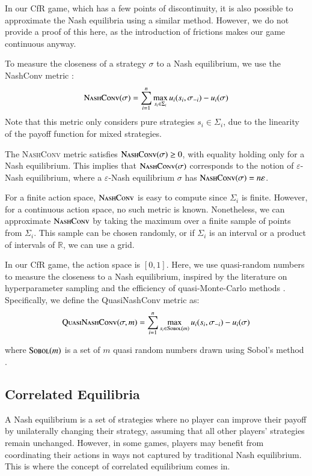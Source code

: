 \documentclass[preprint,12pt,authoryear]{elsarticle}
\theoremstyle{definition}
\begin{document}
In our CfR game, which has a few points of discontinuity, it is also possible to approximate the Nash equilibria using a similar method. However, we do not provide a proof of this here, as the introduction of frictions makes our game continuous anyway. 

To measure the closeness of a strategy $\sigma$ to a Nash equilibrium, we use the NashConv metric \citep{Lanctot2017-wc}: 
$$\textsc{NashConv}(\sigma) = \sum_{i=1}^n \max_{s_i \in \Sigma_i} u_i(s_i, \sigma_{-i}) - u_i(\sigma)$$
Note that this metric only considers pure strategies $s_i \in \Sigma_i$, due to the linearity of the payoff function for mixed strategies. 

The \textsc{NashConv} metric satisfies $\textsc{NashConv}(\sigma) \ge 0$, with equality holding only for a Nash equilibrium. This implies that $\textsc{NashConv}(\sigma)$ corresponds to the notion of $\varepsilon$-Nash equilibrium, where a $\varepsilon$-Nash equilibrium $\sigma$ has $\textsc{NashConv}(\sigma) = n \varepsilon$. 

For a finite action space, $\textsc{NashConv}$ is easy to compute since $\Sigma_i$ is finite. However, for a continuous action space, no such metric is known. Nonetheless, we can approximate $\textsc{NashConv}$ by taking the maximum over a finite sample of points from $\Sigma_i$. This sample can be chosen randomly, or if $\Sigma_i$ is an interval or a product of intervals of $\mathbb{R}$, we can use a grid. 

In our CfR game, the action space is $[0,1]$. Here, we use quasi-random numbers to measure the closeness to a Nash equilibrium, inspired by the literature on hyperparameter sampling \citep{Bousquet2017-kg} and the efficiency of quasi-Monte-Carlo methods \citep{sobol1990quasi}. Specifically, we define the QuasiNashConv metric as: 
$$\textsc{QuasiNashConv}(\sigma, m) = \sum_{i=1}^n \max_{s_i \in \textsc{Sobol}(m)} u_i(s_i, \sigma_{-i}) - u_i(\sigma)$$

where $\textsc{Sobol}(m)$ is a set of $m$ quasi random numbers drawn using Sobol’s method \citep{sobol1967distribution}.

\subsection{Correlated Equilibria}

A Nash equilibrium is a set of strategies where no player can improve their payoff by unilaterally changing their strategy, assuming that all other players' strategies remain unchanged. However, in some games, players may benefit from coordinating their actions in ways not captured by traditional Nash equilibrium. This is where the concept of correlated equilibrium comes in.
\end{document}
